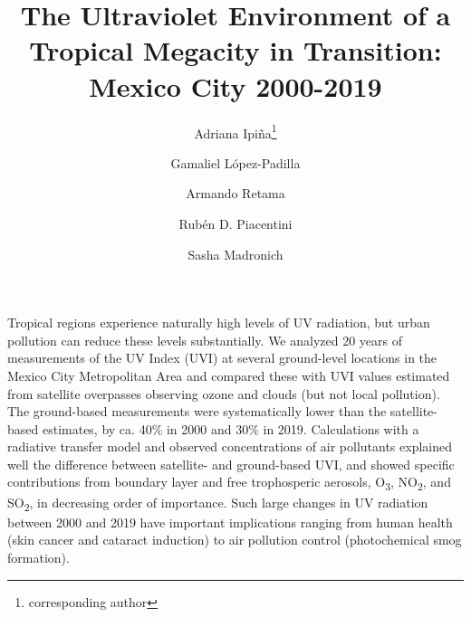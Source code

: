 \documentclass[10pt]{article}
\renewenvironment{abstract}
  {{\bfseries\noindent{\abstractname}\par\nobreak}\footnotesize}
  {\bigskip}
\begin{document}
\title{The Ultraviolet Environment of a Tropical Megacity in Transition: Mexico
  City 2000-2019}


\author[1,2]{Adriana Ipiña\thanks{corresponding author}}
\author[3]{Gamaliel López-Padilla}
\author[4]{Armando Retama}
\author[1]{Rubén D. Piacentini}
\author[5]{Sasha Madronich}



\vspace{-1em}



\date{}


\begingroup
\let\center\flushleft
\let\endcenter\endflushleft
\maketitle
\endgroup


\linenumbers



\doublespacing


\begin{abstract}
  Tropical regions experience naturally high levels of UV radiation, but
  urban pollution can reduce these levels substantially. We analyzed 20
  years of measurements of the UV Index (UVI) at several ground-level
  locations in the Mexico City Metropolitan Area and compared these with
  UVI values estimated from satellite overpasses observing ozone and
  clouds (but not local pollution). The ground-based measurements were
  systematically lower than the satellite-based estimates, by ca. 40\% in
  2000 and 30\% in 2019. Calculations with a radiative transfer model and
  observed concentrations of air pollutants explained well the difference
  between satellite- and ground-based UVI, and showed specific
  contributions from boundary layer and free trophosperic aerosols,
  O\textsubscript{3}, NO\textsubscript{2}, and SO\textsubscript{2}, in
  decreasing order of importance. Such large changes in UV radiation
  between 2000 and 2019 have important implications ranging from human
  health (skin cancer and cataract induction) to air pollution control
  (photochemical smog formation).%
\end{abstract}%
\end{document}
